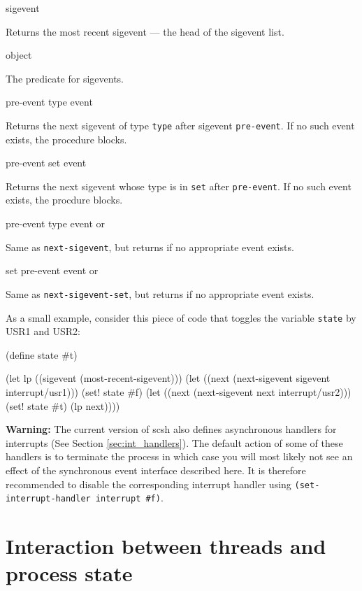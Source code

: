  {} {sigevent}

Returns the most recent sigevent --- the head of the sigevent
list.

 {object} {\boolean}

The predicate for sigevents.

 {pre-event type} {event} 

Returns the next sigevent of type \texttt{type} after sigevent
\texttt{pre-event}. If no such event exists, the procedure blocks.

 {pre-event set} {event}

Returns the next sigevent whose type is in \texttt{set} after
\texttt{pre-event}. If no such event exists, the procdure blocks. 

 {pre-event type} {event or \sharpf}

Same as \texttt{next-sigevent}, but returns \sharpf if no appropriate
event exists.

 {set pre-event} {event or \sharpf}

Same as \texttt{next-sigevent-set}, but returns \sharpf if no appropriate
event exists.

As a small example, consider this piece of code that toggles the
variable \texttt{state} by USR1 and USR2:
\begin{code}
(define state #t)

(let lp ((sigevent (most-recent-sigevent)))
  (let ((next (next-sigevent sigevent interrupt/usr1)))
    (set! state #f)
    (let ((next (next-sigevent next interrupt/usr2)))
      (set! state #t)
      (lp next))))
\end{code}

\textbf{Warning:} The current version of scsh also defines
asynchronous handlers for interrupts (See Section
\ref{sec:int_handlers}). The default action of some of these handlers
is to terminate the process in which case you will most likely not see
an effect of the synchronous event interface described here. It is
therefore recommended to disable the corresponding interrupt handler
using \texttt{(set-interrupt-handler interrupt \#f)}.

\section{Interaction between threads and process state}
\label{sec:ps_interac}

